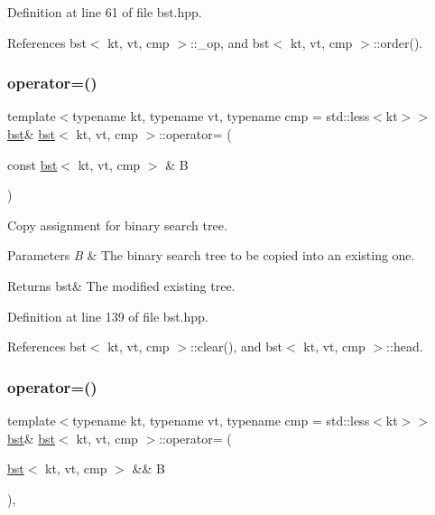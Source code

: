 Definition at line 61 of file bst.\+hpp.



References bst$<$ kt, vt, cmp $>$\+::\+\_\+op, and bst$<$ kt, vt, cmp $>$\+::order().

\mbox{\label{classbst_a962fce8c5811b3bab57d298b6752481f}} 
\subsubsection{\texorpdfstring{operator=()}{operator=()}\hspace{0.1cm}{\footnotesize\ttfamily [1/2]}}
{\footnotesize\ttfamily template$<$typename kt, typename vt, typename cmp = std\+::less$<$kt$>$$>$ \\
\hyperlink{classbst}{bst}\& \hyperlink{classbst}{bst}$<$ kt, vt, cmp $>$\+::operator= (\begin{DoxyParamCaption}\item[{const \hyperlink{classbst}{bst}$<$ kt, vt, cmp $>$ \&}]{B }\end{DoxyParamCaption})\hspace{0.3cm}{\ttfamily [inline]}}



Copy assignment for binary search tree. 


\begin{DoxyParams}{Parameters}
{\em B} & The binary search tree to be copied into an existing one. \\
\hline
\end{DoxyParams}
\begin{DoxyReturn}{Returns}
bst\& The modified existing tree. 
\end{DoxyReturn}


Definition at line 139 of file bst.\+hpp.



References bst$<$ kt, vt, cmp $>$\+::clear(), and bst$<$ kt, vt, cmp $>$\+::head.

\mbox{\label{classbst_a3e595b50a147f3c6fe64f1b1514c539d}} 
\subsubsection{\texorpdfstring{operator=()}{operator=()}\hspace{0.1cm}{\footnotesize\ttfamily [2/2]}}
{\footnotesize\ttfamily template$<$typename kt, typename vt, typename cmp = std\+::less$<$kt$>$$>$ \\
\hyperlink{classbst}{bst}\& \hyperlink{classbst}{bst}$<$ kt, vt, cmp $>$\+::operator= (\begin{DoxyParamCaption}\item[{\hyperlink{classbst}{bst}$<$ kt, vt, cmp $>$ \&\&}]{B }\end{DoxyParamCaption})\hspace{0.3cm}{\ttfamily [inline]}, {\ttfamily [noexcept]}}




